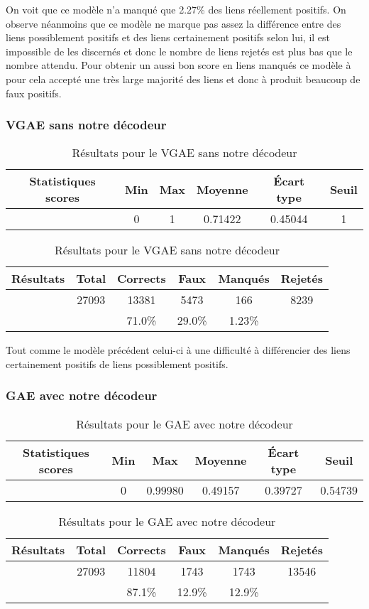 \documentclass{article}
\begin{document}
On voit que ce modèle n’a manqué que 2.27\% des liens réellement positifs. On observe néanmoins que ce modèle ne marque pas assez la différence entre des liens possiblement positifs et des liens certainement positifs selon lui, il est impossible de les discernés et donc le nombre de liens rejetés est plus bas que le nombre attendu. Pour obtenir un aussi bon score en liens manqués ce modèle à pour cela accepté une très large majorité des liens et donc à produit beaucoup de faux positifs.

\subsubsection{VGAE sans notre décodeur}

\begin{table}
    \centering
    \begin{tabular}{|c|c|c|c|c|c|}
        \hline
        Statistiques scores & Min & Max & Moyenne & Écart type & Seuil\\
        \hline
         & 0 & 1 & 0.71422 & 0.45044 & 1 \\
         \hline
    \end{tabular}
    \begin{tabular}{|c|c|c|c|c|c|}
        \hline
        Résultats & Total & Corrects & Faux & Manqués & Rejetés\\
        \hline
         & 27093 & 13381 & 5473 & 166 & 8239\\
        \hline
         &  & 71.0\% & 29.0\% & 1.23\% & \\
        \hline
    \end{tabular}
    \caption{Résultats pour le VGAE sans notre décodeur}
    \label{tab:my_label}
\end{table}
Tout comme le modèle précédent celui-ci à une difficulté à différencier des liens certainement positifs de liens possiblement positifs.

\subsubsection{GAE avec notre décodeur}

\begin{table}
    \centering
    \begin{tabular}{|c|c|c|c|c|c|}
        \hline
        Statistiques scores & Min & Max & Moyenne & Écart type & Seuil\\
        \hline
         & 0 & 0.99980 & 0.49157 & 0.39727 & 0.54739 \\
         \hline
    \end{tabular}
    \begin{tabular}{|c|c|c|c|c|c|}
        \hline
        Résultats & Total & Corrects & Faux & Manqués & Rejetés\\
        \hline
         & 27093 & 11804 & 1743 & 1743 & 13546\\
        \hline
         &  & 87.1\% & 12.9\% & 12.9\% & \\
        \hline
    \end{tabular}
    \caption{Résultats pour le GAE avec notre décodeur}
    \label{tab:my_label}
\end{table}
\end{document}
